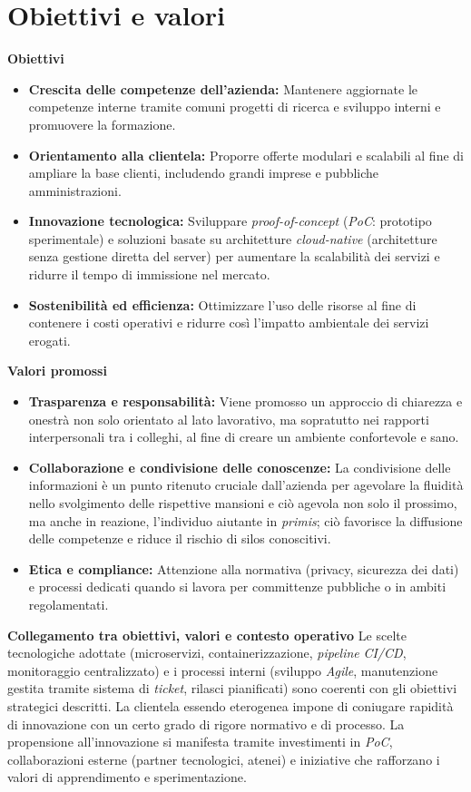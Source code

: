 \section{Obiettivi e valori}

\medskip
\noindent\textbf{Obiettivi}
\begin{itemize}
  \item \textbf{Crescita delle competenze dell'azienda:} Mantenere aggiornate le competenze interne tramite comuni progetti di ricerca e sviluppo interni e promuovere la formazione.
  \item \textbf{Orientamento alla clientela:} Proporre offerte modulari e scalabili al fine di ampliare la base clienti, includendo grandi imprese e pubbliche amministrazioni.
  \item \textbf{Innovazione tecnologica:} Sviluppare \emph{proof-of-concept} (\emph{PoC}: prototipo sperimentale) e soluzioni basate su architetture \emph{cloud-native} (architetture senza gestione diretta del server) per aumentare la scalabilità dei servizi e ridurre il tempo di immissione nel mercato.
  \item \textbf{Sostenibilità ed efficienza:} Ottimizzare l'uso delle risorse al fine di contenere i costi operativi e ridurre così l'impatto ambientale dei servizi erogati.
\end{itemize}

\medskip
\noindent\textbf{Valori promossi}
\begin{itemize}
  \item \textbf{Trasparenza e responsabilità:} Viene promosso un approccio di chiarezza e onestrà non solo orientato al lato lavorativo, ma sopratutto nei rapporti interpersonali tra i colleghi, al fine di creare un ambiente confortevole e sano.
  \item \textbf{Collaborazione e condivisione delle conoscenze:} La condivisione delle informazioni è un punto ritenuto cruciale dall'azienda per agevolare la fluidità nello svolgimento delle rispettive mansioni e ciò agevola non solo il prossimo, ma anche in reazione, l'individuo aiutante in \emph{primis}; ciò favorisce la diffusione delle competenze e riduce il rischio di silos conoscitivi.
  \item \textbf{Etica e compliance:} Attenzione alla normativa (privacy, sicurezza dei dati) e processi dedicati quando si lavora per committenze pubbliche o in ambiti regolamentati.
\end{itemize}

\medskip
\noindent\textbf{Collegamento tra obiettivi, valori e contesto operativo} Le scelte tecnologiche adottate 
(microservizi, containerizzazione, \emph{pipeline} \emph{CI/CD}, monitoraggio centralizzato) e i processi interni 
(sviluppo \emph{Agile}, manutenzione gestita tramite sistema di \emph{ticket}, rilasci pianificati) sono coerenti con gli obiettivi strategici descritti. 
La clientela essendo eterogenea impone di coniugare rapidità di innovazione con un certo grado di rigore normativo e di processo.
La propensione all'innovazione si manifesta tramite investimenti in \emph{PoC}, collaborazioni esterne (partner tecnologici, atenei) 
e iniziative che rafforzano i valori di apprendimento e sperimentazione.


